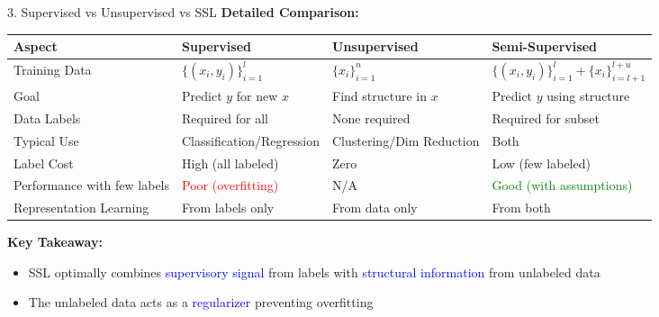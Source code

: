 \documentclass[8pt]{beamer}
\begin{document}
	\begin{frame}{3. Supervised vs Unsupervised vs SSL}
		\fontsize{6.5}{7.5}\selectfont
		\textbf{Detailed Comparison:}
		
		\begin{tabular}{|p{2.0cm}|p{2.5cm}|p{2.5cm}|p{2.5cm}|}
			\hline
			\textbf{Aspect} & \textbf{Supervised} & \textbf{Unsupervised} & \textbf{Semi-Supervised} \\
			\hline
			Training Data & $\{(x_i,y_i)\}_{i=1}^l$ & $\{x_i\}_{i=1}^{n}$ & $\{(x_i,y_i)\}_{i=1}^l + \{x_i\}_{i=l+1}^{l+u}$ \\
			\hline
			Goal & Predict $y$ for new $x$ & Find structure in $x$ & Predict $y$ using structure \\
			\hline
			Data Labels & Required for all & None required & Required for subset \\
			\hline
			Typical Use & Classification/Regression & Clustering/Dim Reduction & Both \\
			\hline
			Label Cost & High (all labeled) & Zero & Low (few labeled) \\
			\hline
			Performance with few labels & \textcolor{red}{Poor (overfitting)} & N/A & \textcolor{green}{Good (with assumptions)} \\
			\hline
			Representation Learning & From labels only & From data only & From both \\
			\hline
		\end{tabular}
		
		\textbf{Key Takeaway:}
		\begin{itemize}
			\item SSL optimally combines \textcolor{blue}{supervisory signal} from labels with \textcolor{blue}{structural information} from unlabeled data
			\item The unlabeled data acts as a \textcolor{blue}{regularizer} preventing overfitting
		\end{itemize}
	\end{frame}
	
\end{document}
